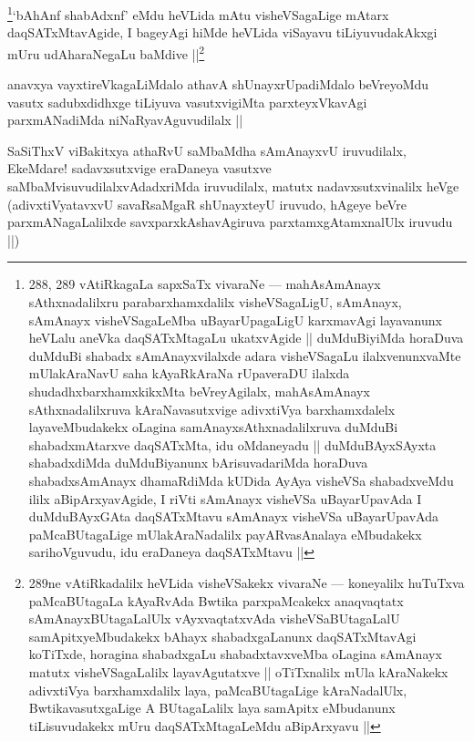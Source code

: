 \begin{artha}
\footnote[1]{288, 289 vAtiRkagaLa sapxSaTx vivaraNe --- mahAsAmAnayx sAthxnadalilxru parabarxhamxdalilx visheVSagaLigU, sAmAnayx, sAmAnayx visheVSagaLeMba uBayarUpagaLigU karxmavAgi layavanunx heVLalu aneVka daqSATxMtagaLu ukatxvAgide || duMduBiyiMda horaDuva duMduBi shabadx sAmAnayxvilalxde adara visheVSagaLu ilalxvenunxvaMte mUlakAraNavU saha kAyaRkAraNa rUpaveraDU ilalxda shudadhxbarxhamxkikxMta beVreyAgilalx, mahAsAmAnayx sAthxnadalilxruva kAraNavasutxvige adivxtiVya barxhamxdalelx layaveMbudakekx oLagina samAnayxsAthxnadalilxruva duMduBi shabadxmAtarxve daqSATxMta, idu oMdaneyadu || duMduBAyxSAyxta shabadxdiMda duMduBiyanunx bArisuvadariMda horaDuva shabadxsAmAnayx dhamaRdiMda kUDida AyAya visheVSa shabadxveMdu ililx aBipArxyavAgide, I riVti sAmAnayx visheVSa uBayarUpavAda I duMduBAyxGAta daqSATxMtavu sAmAnayx visheVSa uBayarUpavAda paMcaBUtagaLige mUlakAraNadalilx payARvasAnalaya eMbudakekx sarihoVguvudu, idu eraDaneya daqSATxMtavu ||}`bAhAnf shabAdxnf' eMdu heVLida mAtu visheVSagaLige mAtarx daqSATxMtavAgide, I bageyAgi hiMde heVLida viSayavu tiLiyuvudakAkxgi mUru udAharaNegaLu baMdive ||\footnote[2]{289ne vAtiRkadalilx heVLida visheVSakekx vivaraNe --- koneyalilx huTuTxva paMcaBUtagaLa kAyaRvAda Bwtika parxpaMcakekx anaqvaqtatx sAmAnayxBUtagaLalUlx vAyxvaqtatxvAda visheVSaBUtagaLalU samApitxyeMbudakekx bAhayx shabadxgaLanunx daqSATxMtavAgi koTiTxde, horagina shabadxgaLu shabadxtavxveMba oLagina sAmAnayx matutx visheVSagaLalilx layavAgutatxve || oTiTxnalilx mUla kAraNakekx adivxtiVya barxhamxdalilx laya, paMcaBUtagaLige kAraNadalUlx, BwtikavasutxgaLige A BUtagaLalilx laya samApitx eMbudanunx tiLisuvudakekx mUru daqSATxMtagaLeMdu aBipArxyavu ||}
\end{artha}

\begin{artha}
anavxya vayxtireVkagaLiMdalo athavA shUnayxrUpadiMdalo beVreyoMdu vasutx sadubxdidhxge tiLiyuva vasutxvigiMta parxteyxVkavAgi parxmANadiMda niNaRyavAguvudilalx ||
\end{artha}

\begin{artha}
SaSiThxV viBakitxya athaRvU saMbaMdha sAmAnayxvU iruvudilalx, EkeMdare! sadavxsutxvige eraDaneya vasutxve saMbaMvisuvudilalxvAdadxriMda iruvudilalx, matutx nadavxsutxvinalilx heVge (adivxtiVyatavxvU savaRsaMgaR shUnayxteyU iruvudo, hAgeye beVre parxmANagaLalilxde savxparxkAshavAgiruva parxtamxgAtamxnalUlx iruvudu ||)
\end{artha}

